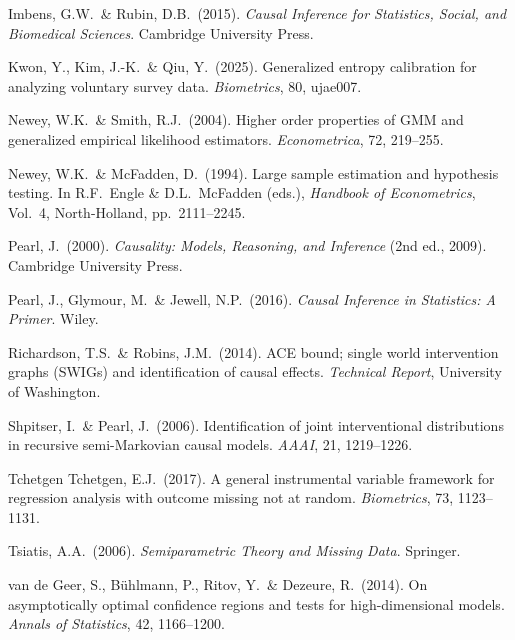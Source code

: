 \documentclass[12pt]{article}
\begin{document}
\begin{description}[leftmargin=1.8em, labelindent=0pt, itemsep=3pt]
  \item Imbens, G.W.\ \& Rubin, D.B.\ (2015).
    \textit{Causal Inference for Statistics, Social, and Biomedical
    Sciences}.
    Cambridge University Press.

  \item Kwon, Y., Kim, J.-K.\ \& Qiu, Y.\ (2025).
    Generalized entropy calibration for analyzing voluntary survey data.
    \textit{Biometrics}, 80, ujae007.

  \item Newey, W.K.\ \& Smith, R.J.\ (2004).
    Higher order properties of GMM and generalized empirical likelihood
    estimators.
    \textit{Econometrica}, 72, 219--255.

  \item Newey, W.K.\ \& McFadden, D.\ (1994).
    Large sample estimation and hypothesis testing.
    In R.F.\ Engle \& D.L.\ McFadden (eds.),
    \textit{Handbook of Econometrics}, Vol.~4,
    North-Holland, pp.~2111--2245.

  \item Pearl, J.\ (2000).
    \textit{Causality: Models, Reasoning, and Inference}
    (2nd ed., 2009). Cambridge University Press.

  \item Pearl, J., Glymour, M.\ \& Jewell, N.P.\ (2016).
    \textit{Causal Inference in Statistics: A Primer}. Wiley.

  \item Richardson, T.S.\ \& Robins, J.M.\ (2014).
    ACE bound; single world intervention graphs (SWIGs) and
    identification of causal effects.
    \textit{Technical Report}, University of Washington.

  \item Shpitser, I.\ \& Pearl, J.\ (2006).
    Identification of joint interventional distributions in recursive
    semi-Markovian causal models.
    \textit{AAAI}, 21, 1219--1226.

  \item Tchetgen Tchetgen, E.J.\ (2017).
    A general instrumental variable framework for regression analysis
    with outcome missing not at random.
    \textit{Biometrics}, 73, 1123--1131.

  \item Tsiatis, A.A.\ (2006).
    \textit{Semiparametric Theory and Missing Data}. Springer.

  \item van de Geer, S., B\"uhlmann, P., Ritov, Y.\ \& Dezeure, R.\
    (2014).
    On asymptotically optimal confidence regions and tests for
    high-dimensional models.
    \textit{Annals of Statistics}, 42, 1166--1200.


\end{description}
\end{document}
